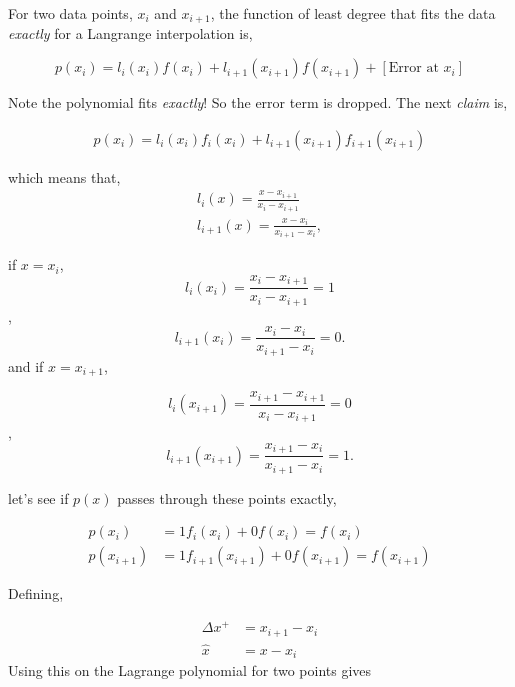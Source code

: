 \documentclass[12pt]{article}
\begin{document}
For two data points, $x_i$ and $x_{i+1}$, the function of least degree
that fits the data \textit{exactly} for a Langrange interpolation is,

\begin{equation*}
    p(x_i) = l_{i}(x_i)f(x_{i}) + l_{i+1}(x_{i+1})f(x_{i+1}) + \left[\text{
        Error at $x_i$}
    \right]
\end{equation*}

Note the polynomial fits  \textit{exactly}! So the error term is dropped.
The next \textit{claim} is,

\begin{align*}
    p(x_i) =  
    l_i\left( x_i\right)f_i\left( x_i\right) + 
    l_{i+1}\left( x_{i+1}\right)f_{i+1}\left( x_{i+1}\right) 
\end{align*}

which means that,
\begin{align*}
    l_i(x) = \frac{x - x_{i+1}}{x_{i} - x_{i+1}} \\
    l_{i+1}(x) = \frac{x - x_{i}}{x_{i+1} - x_{i}},
\end{align*}

if $x = x_i$,
\[ l_i(x_i) = \frac{x_i - x_{i+1}}{x_i - x_{i+1} }= 1\], 
\[l_{i + 1}(x_i) = \frac{x_i-x_i}{x_{i+1} - x_{i}} = 0.\]
and 
if $x = x_{i+1}$,

\[ l_i(x_{i+1}) = \frac{x_{i+1} - x_{i+1}}{x_i - x_{i+1} }= 0\], 
\[l_{i + 1}(x_{i+1}) = \frac{x_{i+1}-x_i}{x_{i+1} - x_{i}} = 1.\]

let's see if $p\left( x \right)$ passes through these points exactly,

\begin{align*}
    p\left( x_i \right) &= 1 f_i(x_i) + 0 f\left( x_i  \right) =  f\left( x_i  \right) \\
    p\left( x_{i+1} \right) &= 1 f_{i+1}(x_{i+1}) + 0 f\left( x_{i+1}  \right) =  f\left( x_{i+1}  \right) 
\end{align*}

Defining,

\begin{align*}
    \Delta x^+ &= x_{i+1} - x_i \\
    \hat{x} &= x - x_i 
\end{align*}
Using this on the Lagrange polynomial for two points gives 
\end{document}
